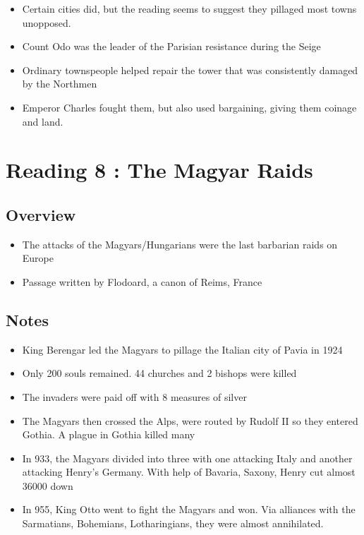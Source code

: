 \documentclass[12pt]{article}
\begin{document}
\begin{itemize}
	\item Certain cities did, but the reading seems to suggest they pillaged most towns unopposed. 
	\item Count Odo was the leader of the Parisian resistance during the Seige
	\item Ordinary townspeople helped repair the tower that was consistently damaged by the Northmen
	\item Emperor Charles fought them, but also used bargaining, giving them coinage and land.
\end{itemize}


\section*{Reading 8 : The Magyar Raids}

\subsection*{Overview}

\begin{itemize}
	\item The attacks of the Magyars/Hungarians were the last barbarian raids on Europe
	\item Passage written by Flodoard, a canon of Reims, France
\end{itemize}

\subsection*{Notes}

\begin{itemize}
	\item King Berengar led the Magyars to pillage the Italian city of Pavia in 1924
	\item Only 200 souls remained. 44 churches and 2 bishops were killed
	\item The invaders were paid off with 8 measures of silver
	\item The Magyars then crossed the Alps, were routed by Rudolf II so they entered Gothia. A plague in Gothia killed many
	\item In 933, the Magyars divided into three with one attacking Italy and another attacking Henry's Germany. With help of Bavaria, Saxony, Henry cut almost 36000 down
	\item In 955, King Otto went to fight the Magyars and won. Via alliances with the Sarmatians, Bohemians, Lotharingians, they were almost annihilated.
\end{itemize}
\end{document}
